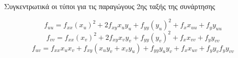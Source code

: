   \begin{rem}
    Συγκεντρωτικά οι τύποι για τις παραγώγους 2ης ταξής της συνάρτησης 

    \[
      f_{uu}= f_{xx}(x_{u})^{2}+ 2f_{xy}x_{u}y_{u} + f_{yy}(y_{u})^{2} + f_{x}x_{uu} + 
      f_{y}y_{uu} 
    \] 
    \[
      f_{vv}= f_{xx}(x_{v})^{2}+ 2f_{xy}x_{v}y_{v} + f_{yy}(y_{v})^{2} + f_{x}x_{vv} + 
      f_{y}y_{vv} 
    \]
    \[
      f_{uv}= f_{xx}x_{u}x_{v}+ f_{xy}(x_{u}y_{v} + x_{v}y_{u}) + 
      f_{yy}y_{u}y_{v} + f_{x}x_{uv} + f_{y}y_{v} 
      f_{y}y_{vv} 
    \]
  \end{rem}





